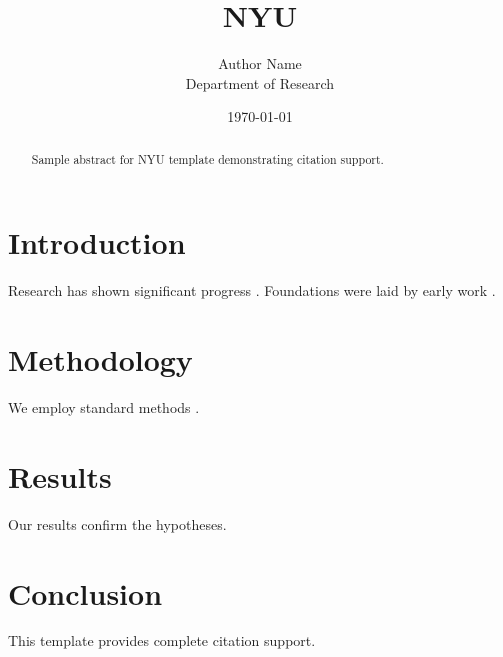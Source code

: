 \documentclass{thesis_nyu}
\title{NYU}
\author{Author Name \\ \small Department of Research}
\date{\today}
\begin{document}
\maketitle

\begin{abstract}
Sample abstract for NYU template demonstrating citation support.
\end{abstract}

\section{Introduction}
Research has shown significant progress \citep{einstein1905}. Foundations were laid by early work \citep{turing1950}.

\section{Methodology}
We employ standard methods \citep{knuth1984}.

\section{Results}
Our results confirm the hypotheses.

\section{Conclusion}
This template provides complete citation support.



\end{document}
